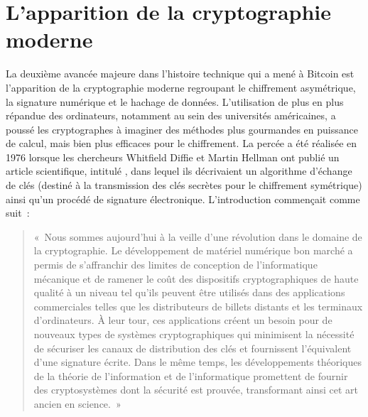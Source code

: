 \section*{L'apparition de la cryptographie moderne} %

La deuxième avancée majeure dans l'histoire technique qui a mené à Bitcoin est l'apparition de la cryptographie moderne regroupant le chiffrement asymétrique, la signature numérique et le hachage de données. L'utilisation de plus en plus répandue des ordinateurs, notamment au sein des universités américaines, a poussé les cryptographes à imaginer des méthodes plus gourmandes en puissance de calcul, mais bien plus efficaces pour le chiffrement. La percée a été réalisée en 1976 lorsque les chercheurs Whitfield Diffie et Martin Hellman ont publié un article scientifique, intitulé , dans lequel ils décrivaient un algorithme d'échange de clés (destiné à la transmission des clés secrètes pour le chiffrement symétrique) ainsi qu'un procédé de signature électronique. L'introduction commençait comme suit~:

\begin{quote}
«~Nous sommes aujourd'hui à la veille d'une révolution dans le domaine de la cryptographie. Le développement de matériel numérique bon marché a permis de s'affranchir des limites de conception de l'informatique mécanique et de ramener le coût des dispositifs cryptographiques de haute qualité à un niveau tel qu'ils peuvent être utilisés dans des applications commerciales telles que les distributeurs de billets distants et les terminaux d'ordinateurs. À leur tour, ces applications créent un besoin pour de nouveaux types de systèmes cryptographiques qui minimisent la nécessité de sécuriser les canaux de distribution des clés et fournissent l'équivalent d'une signature écrite. Dans le même temps, les développements théoriques de la théorie de l'information et de l'informatique promettent de fournir des cryptosystèmes dont la sécurité est prouvée, transformant ainsi cet art ancien en science.~»
\end{quote} %


